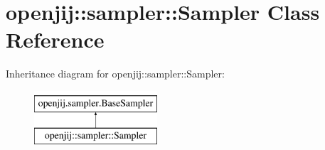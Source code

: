 \hypertarget{structopenjij_1_1sampler_1_1_sampler}{}\section{openjij\+::sampler\+::Sampler Class Reference}
\label{structopenjij_1_1sampler_1_1_sampler}
Inheritance diagram for openjij\+::sampler\+::Sampler\+:\begin{figure}[H]
\begin{center}
\leavevmode
\includegraphics[height=2.000000cm]{structopenjij_1_1sampler_1_1_sampler}
\end{center}
\end{figure}
